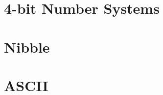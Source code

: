 \documentclass[11pt]{article}
\begin{document}
\vfill

\clearpage

\begin{minipage}[t]{0.68\linewidth}
	\begin{minipage}[t]{0.48\linewidth}
		\section*{4-bit Number Systems}
		
	\end{minipage}
    \hfill
    \begin{minipage}[t]{0.48\linewidth}
		\section*{Nibble}
		
	\end{minipage}

	\vspace{1em}

	\begin{minipage}[t]{0.64\linewidth}
		
	\end{minipage}
	\hfill
	\begin{minipage}[t]{0.32\linewidth}
		
	\end{minipage}

	\begin{minipage}[t]{\linewidth}
		
	\end{minipage}

	\vspace{1em}

	\begin{minipage}[t]{\linewidth}
		
	\end{minipage}
\end{minipage}
\hfill
\begin{minipage}[t]{0.28\linewidth}
	\section*{ASCII}
    \centering
	
\end{minipage}
\end{document}
